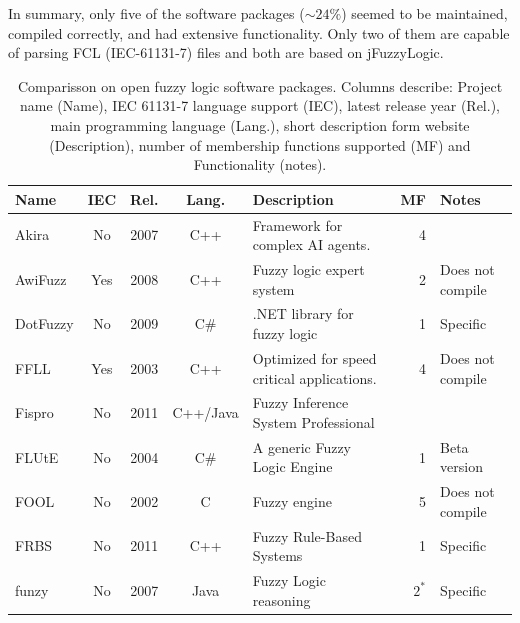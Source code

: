 \documentclass[conference]{IEEEtran}
\begin{document}
In summary, only five of the software packages ($\sim 24\%$) seemed to be maintained, compiled correctly, and had extensive functionality. 
Only two of them are capable of parsing FCL (IEC-61131-7) files and both are based on jFuzzyLogic.

\begin{table}[!t]
	\renewcommand{\arraystretch}{1.3}
	\caption{Comparisson on open fuzzy logic software packages. Columns describe: Project name (Name), IEC 61131-7 language support (IEC), latest release year (Rel.), main programming language (Lang.), short description form website (Description), number of membership functions supported (MF) and Functionality (notes).}
	\label{t:comp}
	\centering
	\begin{tabular}{|l|c|c|c|l|r|l|}
		\hline
		\textbf{Name}	
			& \textbf{IEC}
			& \textbf{Rel.}
			& \textbf{Lang.} 
			& \textbf{Description}
			& \textbf{MF}
			& \textbf{Notes}	
			\\
		\hline
		Akira				
			& No	
			& 2007 
			& C++
			& Framework for complex AI agents.
			& 4
			&
			\\

		AwiFuzz				
			& Yes	
			& 2008 
			& C++
			& Fuzzy logic expert system
			& 2
			& Does not compile
			\\

		DotFuzzy			
			& No	
			& 2009 
			& C\#
			& .NET library for fuzzy logic
			& 1
			& Specific
			\\

		FFLL				
			& Yes	
			& 2003 
			& C++
			& Optimized for speed critical applications.
			& 4
			& Does not compile 
			\\

		Fispro
			& No
			& 2011
			& C++/Java
			& Fuzzy Inference System Professional
			& 
			& 
			\\

		FLUtE 				
			& No	
			& 2004 
			& C\#
			& A generic Fuzzy Logic Engine
			& 1
			& Beta version 
			\\

		FOOL				
			& No	
			& 2002 
			& C
			& Fuzzy engine
			& 5
			& Does not compile
			\\

		FRBS
			& No
			& 2011
			& C++
			& Fuzzy Rule-Based Systems
			& 1
			& Specific
			\\
			
		funzy
			& No
			& 2007
			& Java
			& Fuzzy Logic reasoning
			& $2^*$
			& Specific
			\\
			

\end{tabular}
\end{table}
\end{document}
